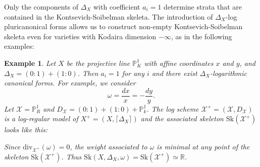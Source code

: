 \documentclass{amsart}%
\numberwithin{equation}{subsection}
\theoremstyle{plain2}
\theoremstyle{definition2}
\newtheorem{example}[equation]{Example}
\theoremstyle{stepstyle}
\theoremstyle{point}
\theoremstyle{subpoint}
\newcommand{\R}{\ensuremath{\mathbb{R}}}
\newcommand{\cX}{\ensuremath{\mathscr{X}}}
\renewcommand{\R}{\ensuremath{\mathbb{R}}}
\newcommand{\divisor}{\mathrm{div}}
\newcommand{\Sk}{\mathrm{Sk}}
\begin{document}

Only the components of $\Delta_X$ with coefficient $a_i=1$ determine strata that are contained in the Kontsevich-Soibelman skeleta. The introduction of $\Delta_X$-log pluricanonical forms allows us to construct non-empty Kontsevich-Soibelman skeleta even for varieties with Kodaira dimension $-\infty$, as in the following examples:


\begin{example}
Let $X$ be the projective line $\mathbb{P}^1_K$ with affine coordinates $x$ and $y$, and $\Delta_X=(0:1) + (1:0)$. Then $a_i=1$ for any $i$ and there exist $\Delta_X$-logarithmic canonical forms. For example, we consider $$\omega =  \frac{dx}{x}= -\frac{dy}{y}.$$ Let $\cX= \mathbb{P}_R^1$ and $D_\cX= (0:1) + (1:0)+ \mathbb{P}^1_k$. The log scheme $\cX^+=(\cX,D_\cX)$ is a log-regular model of $X^+=(X,\lceil \Delta_X \rceil)$ and the associated skeleton $\Sk(\cX^+)$ looks like this:
\begin{center}
\end{center}
Since $\divisor_{\cX^+}(\omega)= 0$, the weight associated to $\omega$ is minimal at any point of the skeleton $\Sk(\cX^+)$. Thus $\Sk(X,\Delta_X,\omega)=\Sk(\cX^+) \simeq \R$.
\end{example}
\end{document}
